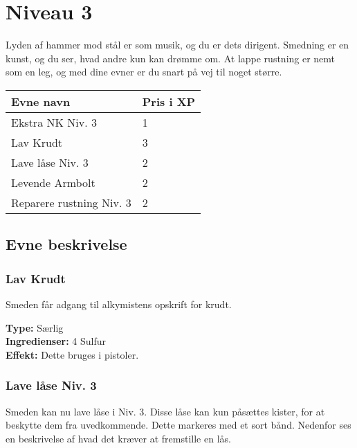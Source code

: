 \chapter{Niveau 3}
Lyden af hammer mod stål er som musik, og du er dets dirigent. Smedning er en kunst, og du ser, hvad andre kun kan drømme om. At lappe rustning er nemt som en leg, og med dine evner er du snart på vej til noget større.

\begin{table}[H]
    \centering
    \begin{tabular}{|p{}|p{}|}
    \rowcolor{cerulean!80}\hline
        Evne navn & Pris i XP \\\hline
        Ekstra NK Niv. 3 & 1 \\\hline
        Lav Krudt & 3 \\\hline
        Lave låse Niv. 3 & 2 \\\hline
        Levende Armbolt & 2 \\\hline
        Reparere rustning Niv. 3 & 2\\\hline
    \end{tabular}
\end{table}
\section{Evne beskrivelse}



\subsection{Lav Krudt}
Smeden får adgang til alkymistens opskrift for krudt.
\begin{særlig*}[Krudt]
\textbf{Type:} Særlig\\
\textbf{Ingredienser:} 4 Sulfur\\
\textbf{Effekt:} Dette bruges i pistoler.\\
\end{særlig*}

\subsection{Lave låse Niv. 3}
Smeden kan nu lave låse i Niv. 3. Disse låse kan kun påsættes kister, for at beskytte dem fra uvedkommende. Dette markeres med et sort bånd. Nedenfor ses en beskrivelse af hvad det kræver at fremstille en lås.\\

